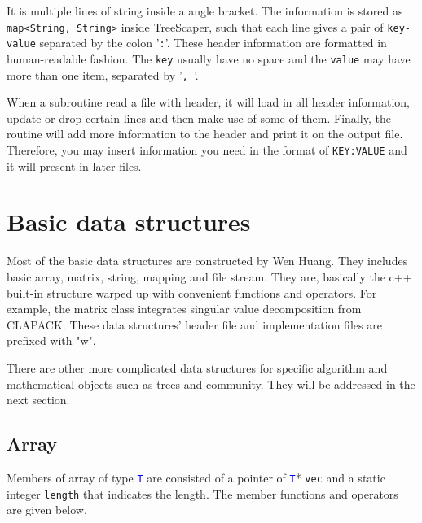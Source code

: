 \documentclass[11pt,a4paper]{article}
\newcommand{\ttype}[1]{\textcolor{blue}{\texttt{#1}}}
\theoremstyle{definition}
\theoremstyle{definition}
\numberwithin{equation}{section}
\begin{document}
	It is multiple lines of string inside a angle bracket. The information is stored as \texttt{map<String, String>} inside TreeScaper, such that each line gives a pair of \texttt{key-value} separated by the colon '\texttt{:}'. These header information are formatted in human-readable fashion. The \texttt{key} usually have no space and the \texttt{value} may have more than one item, separated by '\texttt{, }'.
	
	When a subroutine read a file with header, it will load in all header information, update or drop certain lines and then make use of some of them. Finally, the routine will add more information to the header and print it on the output file. Therefore, you may insert information you need in the format of \texttt{KEY:VALUE} and it will present in later files.
	
	\section{Basic data structures}
	
	Most of the basic data structures are constructed by Wen Huang. They includes basic array, matrix, string, mapping and file stream. They are, basically the c++ built-in structure warped up with convenient functions and operators. For example, the matrix class integrates singular value decomposition from CLAPACK. These data structures' header file and implementation files are prefixed with "w".
	
	There are other more complicated data structures for specific algorithm and mathematical objects such as trees and community. They will be addressed in the next section. 
	
	\subsection{Array}
	
	Members of array of type \ttype{T} are consisted of a pointer of \ttype{T}* \texttt{vec} and a static integer \texttt{length} that indicates the length. The member functions and operators are given below.
	
\end{document}
